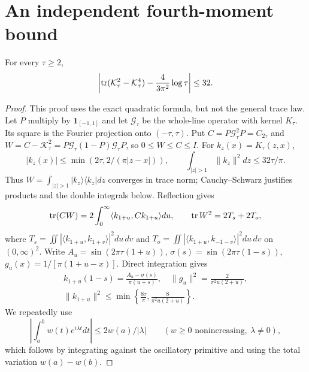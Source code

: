 \section{An independent fourth-moment bound}\label{qshort:sec}
\begin{theorem}\label{T8:thm:quartic}
For every $\tau\ge2$,
\begin{equation}\label{qshort:quartic}
\left|\operatorname{tr}(\mathcal K_\tau^2-\mathcal K_\tau^4)
       -\frac4{3\pi^2}\log\tau\right|\le32.
\end{equation}
\end{theorem}
\begin{proof}
This proof uses the exact quadratic formula, but not the general trace law.
Let $P$ multiply by $\mathbf1_{[-1,1]}$ and let $\mathcal G_\tau$
be the whole-line operator with kernel $K_\tau$.
Its square is the Fourier projection onto $(-\tau,\tau)$.
Put $C=P\mathcal G_\tau^2P=C_{2\tau}$ and
$W=C-\mathcal K_\tau^2=P\mathcal G_\tau(1-P)\mathcal G_\tau P$,
so $0\le W\le C\le I$. For $k_z(x)=K_\tau(z,x)$,
\[
|k_z(x)|\le\min(2\tau,2/(\pi|z-x|)),\qquad
\int_{|z|>1}\|k_z\|^2dz\le32\tau/\pi.
\]
Thus $W=\int_{|z|>1}|k_z\rangle\langle k_z|dz$ converges in trace norm;
Cauchy--Schwarz justifies products and the double integrals below.
Reflection gives
\begin{equation}\label{qshort:reduction}
\operatorname{tr}(CW)=2\int_0^\infty\langle k_{1+u},Ck_{1+u}\rangle du,\qquad
\operatorname{tr} W^2=2T_s+2T_o,
\end{equation}
where $T_s=\iint|\langle k_{1+u},k_{1+v}\rangle|^2du\,dv$
and $T_o=\iint|\langle k_{1+u},k_{-1-v}\rangle|^2du\,dv$ on $(0,\infty)^2$.
Write
$A_u=\sin(2\pi\tau(1+u))$, $\sigma(s)=\sin(2\pi\tau(1-s))$,
$g_u(x)=1/[\pi(1+u-x)]$. Direct integration gives
\begin{equation}\label{qshort:layer}
\begin{gathered}
k_{1+u}(1-s)=\frac{A_u-\sigma(s)}{\pi(u+s)},\quad
\|g_u\|^2=\frac2{\pi^2u(2+u)},\\
\|k_{1+u}\|^2\le\min\left\{\frac{8\tau}\pi,
                            \frac8{\pi^2u(2+u)}\right\}.
\end{gathered}
\end{equation}
We repeatedly use
\begin{equation}\label{qshort:bonnet}
\left|\int_a^b w(t)e^{i\lambda t}dt\right|
\le2w(a)/|\lambda|\qquad(w\ge0\text{ nonincreasing},\ \lambda\ne0),
\end{equation}
which follows by integrating against the oscillatory primitive and
using the total variation $w(a)-w(b)$.


\end{proof}
